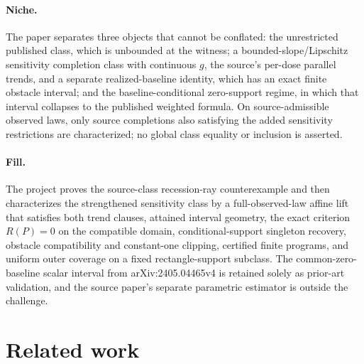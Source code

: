 \documentclass{article}
\begin{document}
\paragraph{Niche.} The paper separates three objects that cannot be conflated: the unrestricted published class, which is unbounded at the witness; a bounded-slope/Lipschitz sensitivity completion class with continuous \(g\), the source's per-dose parallel trends, and a separate realized-baseline identity, which has an exact finite obstacle interval; and the baseline-conditional zero-support regime, in which that interval collapses to the published weighted formula. On source-admissible observed laws, only source completions also satisfying the added sensitivity restrictions are characterized; no global class equality or inclusion is asserted.

\paragraph{Fill.} The project proves the source-class recession-ray counterexample and then characterizes the strengthened sensitivity class by a full-observed-law affine lift that satisfies both trend clauses, attained interval geometry, the exact criterion \(R(P)=0\) on the compatible domain, conditional-support singleton recovery, obstacle compatibility and constant-one clipping, certified finite programs, and uniform outer coverage on a fixed rectangle-support subclass. The common-zero-baseline scalar interval from arXiv:2405.04465v4 is retained solely as prior-art validation, and the source paper's separate parametric estimator is outside the challenge.

\section{Related work}
\end{document}
